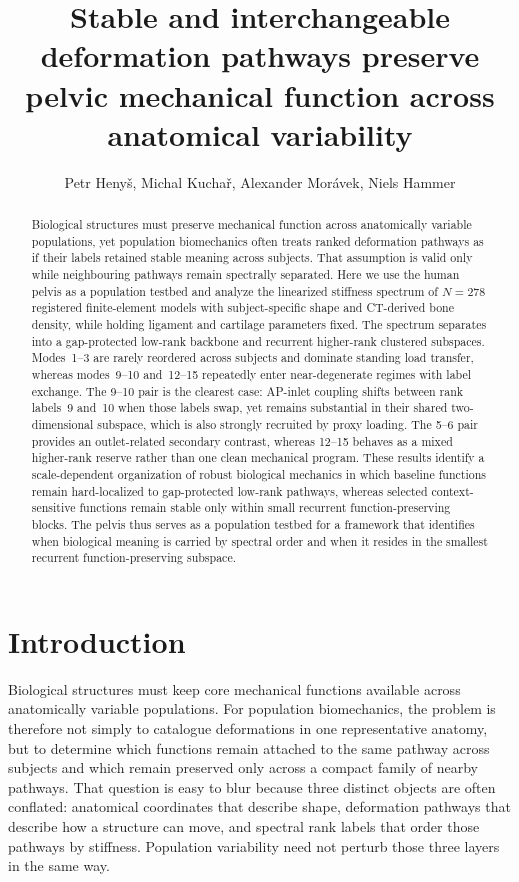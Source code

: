 \documentclass[11pt]{article}
\title{Stable and interchangeable deformation pathways preserve pelvic mechanical function across anatomical variability}
\author{Petr Heny\v{s}, Michal Kucha\v{r}, Alexander Mor\'{a}vek, Niels Hammer}
\date{}
\begin{document}
\maketitle

\begin{abstract}
Biological structures must preserve mechanical function across anatomically variable populations, yet population biomechanics often treats ranked deformation pathways as if their labels retained stable meaning across subjects.
That assumption is valid only while neighbouring pathways remain spectrally separated.
Here we use the human pelvis as a population testbed and analyze the linearized stiffness spectrum of $N{=}278$ registered finite-element models with subject-specific shape and CT-derived bone density, while holding ligament and cartilage parameters fixed.
The spectrum separates into a gap-protected low-rank backbone and recurrent higher-rank clustered subspaces.
Modes~1--3 are rarely reordered across subjects and dominate standing load transfer, whereas modes~9--10 and~12--15 repeatedly enter near-degenerate regimes with label exchange.
The 9--10 pair is the clearest case: AP-inlet coupling shifts between rank labels~9 and~10 when those labels swap, yet remains substantial in their shared two-dimensional subspace, which is also strongly recruited by proxy loading.
The 5--6 pair provides an outlet-related secondary contrast, whereas 12--15 behaves as a mixed higher-rank reserve rather than one clean mechanical program.
These results identify a scale-dependent organization of robust biological mechanics in which baseline functions remain hard-localized to gap-protected low-rank pathways, whereas selected context-sensitive functions remain stable only within small recurrent function-preserving blocks.
The pelvis thus serves as a population testbed for a framework that identifies when biological meaning is carried by spectral order and when it resides in the smallest recurrent function-preserving subspace.
\end{abstract}

\section{Introduction}
\label{sec:introduction}

Biological structures must keep core mechanical functions available across anatomically variable populations.
For population biomechanics, the problem is therefore not simply to catalogue deformations in one representative anatomy, but to determine which functions remain attached to the same pathway across subjects and which remain preserved only across a compact family of nearby pathways.
That question is easy to blur because three distinct objects are often conflated: anatomical coordinates that describe shape, deformation pathways that describe how a structure can move, and spectral rank labels that order those pathways by stiffness.
Population variability need not perturb those three layers in the same way.
\end{document}
